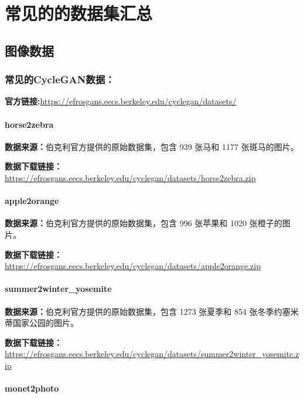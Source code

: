 \chapter{常见的的数据集汇总}

\section{图像数据}
\subsection{常见的CycleGAN数据：}
\textbf{官方链接:}\url{https://efrosgans.eecs.berkeley.edu/cyclegan/datasets/}
\subsubsection{horse2zebra}

\textbf{数据来源：}伯克利官方提供的原始数据集，包含 939 张马和 1177 张斑马的图片。

\textbf{数据下载链接：}
\url{https://efrosgans.eecs.berkeley.edu/cyclegan/datasets/horse2zebra.zip}

\subsubsection{apple2orange}

\textbf{数据来源：}伯克利官方提供的原始数据集，包含 996 张苹果和 1020 张橙子的图片。

\textbf{数据下载链接：}
\url{https://efrosgans.eecs.berkeley.edu/cyclegan/datasets/apple2orange.zip}

\subsubsection{summer2winter\_yosemite}

\textbf{数据来源：}伯克利官方提供的原始数据集，包含 1273 张夏季和 854 张冬季约塞米蒂国家公园的图片。

\textbf{数据下载链接：}
\url{https://efrosgans.eecs.berkeley.edu/cyclegan/datasets/summer2winter_yosemite.zip}

\subsubsection{monet2photo}


